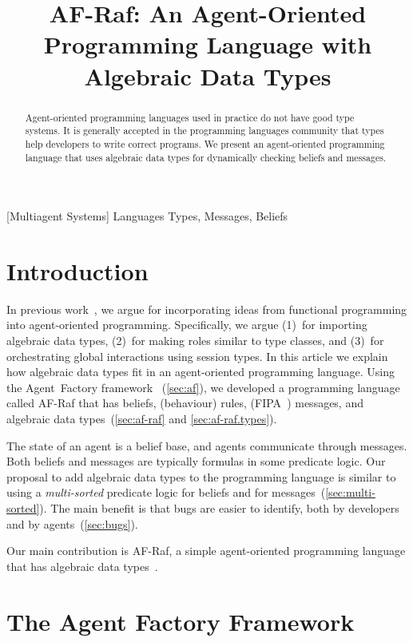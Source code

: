 \documentclass[preprint]{sigplanconf} %
\title{
  AF-Raf: An Agent-Oriented Programming Language with Algebraic Data Types}
\theoremstyle{remark}
\begin{document}
\maketitle
\begin{abstract} %
Agent-oriented programming languages used in practice do not have good type
systems. It is generally accepted in the programming languages community
that types help developers to write correct programs. We present an
agent-oriented programming language that uses algebraic data types for
dynamically checking beliefs and messages.
\end{abstract} %
[Multiagent Systems]
\terms Languages
\keywords Types, Messages, Beliefs

\section{Introduction} %

In previous work~\cite{grigore2011}, we argue for incorporating ideas from
functional programming into agent-oriented programming. Specifically, we
argue (1)~for importing algebraic data types, (2)~for making roles similar
to type classes, and (3)~for orchestrating global interactions using
session types. In this article we explain how algebraic data types fit in
an agent-oriented programming language. Using the Agent~Factory
framework~\cite{russell2011af} (\autoref{sec:af}), we developed a
programming language called AF-Raf that has beliefs, (behaviour) rules,
(FIPA~\cite{poslad2000fipa}) messages, and algebraic data
types~(\autoref{sec:af-raf} and \autoref{sec:af-raf.types}).

The state of an agent is a belief base, and agents communicate through
messages. Both beliefs and messages are typically formulas in some
predicate logic. Our proposal to add algebraic data types to the
programming language is similar to using a \emph{multi-sorted} predicate
logic for beliefs and for messages~(\autoref{sec:multi-sorted}). The main
benefit is that bugs are easier to identify, both by developers and by
agents~(\autoref{sec:bugs}).

Our main contribution is AF-Raf, a simple agent-oriented programming
language that has algebraic data types~\cite{site:af-raf}.

\section{The Agent Factory Framework} \label{sec:af} %
\end{document}

